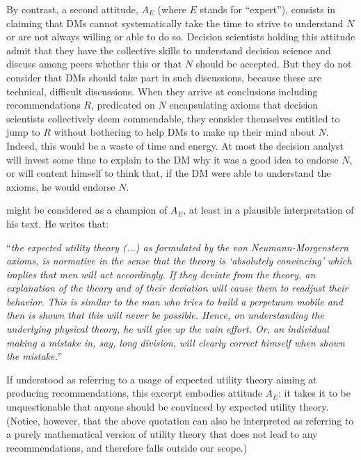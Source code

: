 \documentclass[preprint, french, english, 11pt, authoryear]{elsarticle}%
\begin{document}
By contrast, a second attitude, $A_E$ (where $E$ stands for “expert”), consists in claiming that \acp{DM} cannot systematically take the time to strive to understand $N$ or are not always willing or able to do so. Decision scientists holding this attitude admit that they have the collective skills to understand decision science and discuss among peers whether this or that $N$ should be accepted. But they do not consider that \acp{DM} should take part in such discussions, because these are technical, difficult discussions. When they arrive at conclusions including recommendations $R$, predicated on $N$ encapsulating axioms that decision scientists collectively deem commendable, they consider themselves entitled to jump to $R$ without bothering to help \acp{DM} to make up their mind about $N$. Indeed, this would be a waste of time and energy. At most the decision analyst will invest some time to explain to the \ac{DM} why it was a good idea to endorse $N$, or will content himself to think that, if the \ac{DM} were able to understand the axioms, he would endorse $N$.

\citet[p. 180]{morgenstern_reflections_1979} might be considered as a champion of $A_E$, at least in a plausible interpretation of his text. He writes that: 

\begin{addmargin}[3em]{3em}
“\emph{the expected utility theory (...) as formulated by the von Neumann-Morgenstern axioms, is normative in the sense that the theory is ‘absolutely convincing’ which implies that men will act accordingly. If they deviate from the theory, an explanation of the theory and of their deviation will cause them to readjust their behavior. This is similar to the man who tries to build a perpetuum mobile and then is shown that this will never be possible. Hence, on understanding the underlying physical theory, he will give up the vain effort. Or, an individual making a mistake in, say, long division, will clearly correct himself when shown the mistake.}” 
\end{addmargin}
If understood as referring to a usage of expected utility theory aiming at producing recommendations, this excerpt embodies attitude $A_E$: it takes it to be unquestionable that anyone should be convinced by expected utility theory. (Notice, however, that the above quotation can also be interpreted as referring to a purely mathematical version of utility theory that does not lead to any recommendations, and therefore falls outside our scope.)
\end{document}
